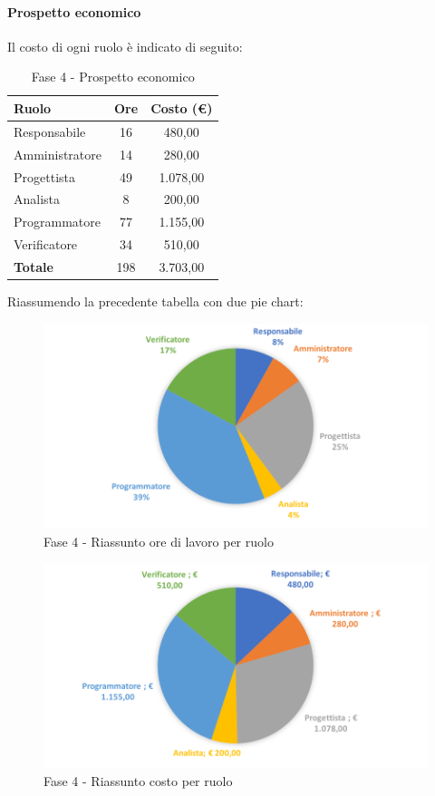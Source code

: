 \documentclass[../PianoDiProgetto.tex]{subfiles}
\begin{document}
			\newpage
			\paragraph{Prospetto economico}
			Il costo di ogni ruolo è indicato di seguito:
			\begin{table}[h]
				\centering
				\begin{tabular}{l * {2}{c}}
				\toprule
				\textbf{Ruolo} & \textbf{Ore} & \textbf{Costo (\euro{})} \\
				\midrule
				Responsabile & 16 & 480,00 \\
				Amministratore & 14 & 280,00 \\
				Progettista & 49 & 1.078,00 \\
				Analista & 8 & 200,00 \\		
				Programmatore & 77 & 1.155,00 \\		
				Verificatore & 34 & 510,00 \\				
				\midrule		
				\textbf{Totale} & 198 & 3.703,00 \\
				\bottomrule	
				\end{tabular}
				\caption{Fase 4 - Prospetto economico}		
			\end{table}
			
			Riassumendo la precedente tabella con due pie chart:	
			\begin{figure}[!h]
				\centering
				\includegraphics[width=\textwidth]{Preventivo/Immagini/fase4_oreRuolo.png}
				\caption{Fase 4 - Riassunto ore di lavoro per ruolo}
			\end{figure}	
			\newpage
			\begin{figure}[!h]
				\centering
				\includegraphics[width=\textwidth]{Preventivo/Immagini/fase4_costoRuolo.png}
				\caption{Fase 4 - Riassunto costo per ruolo}
			\end{figure}	
		
\end{document}
